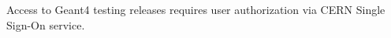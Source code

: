 Access to Geant4 testing releases requires user authorization via CERN Single Sign-On service.





